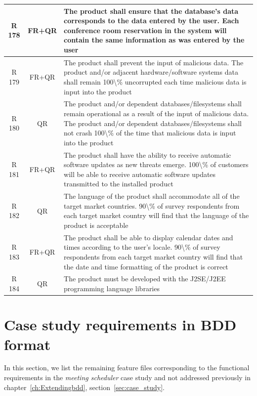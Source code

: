 \documentclass[dissertation,final]{softeng}
\begin{document}
\begin{appendices}
{\begin{center}
\begin{longtable}{c c m{}}
    R 178   & FR+QR & The product shall ensure that the database's data corresponds to the data entered by the user. Each conference room reservation in the system will contain the same information as was entered by the user \\    \midrule
    R 179   & FR+QR & The product shall prevent the input of malicious data. The product and/or adjacent hardware/software systems data shall remain 100\textbackslash{}\% uncorrupted each time malicious data is input into the product \\    \midrule
    R 180   & QR & The product and/or dependent databases/filesystems shall remain operational as a result of the input of malicious data. The product and/or dependent databases/filesystems shall not crash 100\textbackslash{}\% of the time that malicious data is input into the product \\    \midrule
    R 181   & FR+QR & The product shall have the ability to receive automatic software updates as new threats emerge. 100\textbackslash{}\% of customers will be able to receive automatic software updates transmitted to the installed product \\    \midrule
    R 182   & QR & The language of the product shall accommodate all of the target market countries. 90\textbackslash{}\% of survey respondents from each target market country will find that the language of the product is acceptable \\    \midrule
    R 183   & FR+QR & The product shall be able to display calendar dates and times according to the user's locale. 90\textbackslash{}\% of survey respondents from each target market country will find that the date and time formatting of the product is correct \\    \midrule
    R 184   & QR & The product must be developed with the J2SE/J2EE programming language libraries \\
\end{longtable}
\end{center}
}

\section{Case study requirements in BDD format}

In this section, we list the remaining feature files corresponding to the functional requirements in the \emph{meeting scheduler} case study and not addressed previously in chapter~\ref{ch:Extendingbdd}, section~\ref{sec:case_study}.


\end{appendices}
\end{document}
